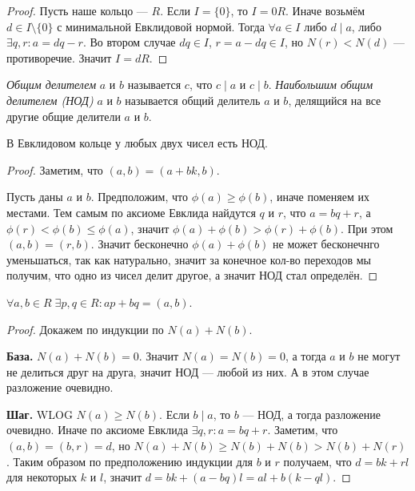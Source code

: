 \documentclass[12pt,a4paper]{article}
\begin{document}
    \begin{proof}
        Пусть наше кольцо --- $R$. Если $I = \{0\}$, то $I = 0R$. Иначе возьмём $d \in I \setminus \{0\}$ с минимальной Евклидовой нормой. Тогда $\forall a \in I$ либо $d \mid a$, либо $\exists q, r: a = dq - r$. Во втором случае $dq \in I$, $r = a - dq \in I$, но $N(r) < N(d)$ --- противоречие. Значит $I = dR$.
    \end{proof}

    \begin{definition}
        \emph{Общим делителем} $a$ и $b$ называется $c$, что $c \mid a$ и $c \mid b$. \emph{Наибольшим общим делителем (НОД)} $a$ и $b$ называется общий делитель $a$ и $b$, делящийся на все другие общие делители $a$ и $b$.
    \end{definition}

    \begin{theorem}
        В Евклидовом кольце у любых двух чисел есть НОД.
    \end{theorem}

    \begin{proof}
        Заметим, что $(a, b) = (a + bk, b)$.
        
        Пусть даны $a$ и $b$. Предположим, что $\phi(a) \geqslant \phi(b)$, иначе поменяем их местами. Тем самым по аксиоме Евклида найдутся $q$ и $r$, что $a = bq + r$, а $\phi(r) < \phi(b) \leqslant \phi(a)$, значит $\phi(a) + \phi(b) > \phi(r) + \phi(b)$. При этом $(a, b) = (r, b)$. Значит бесконечно $\phi(a) + \phi(b)$ не может бесконечнго уменьшаться, так как натурально, значит за конечное кол-во переходов мы получим, что одно из чисел делит другое, а значит НОД стал определён.
    \end{proof}

    \begin{theorem}
        $\forall a, b \in R\; \exists p, q \in R: ap + bq = (a, b)$.
    \end{theorem}

    \begin{proof}
        Докажем по индукции по $N(a) + N(b)$.

        \textbf{База.} $N(a) + N(b)=0$. Значит $N(a)=N(b)=0$, а тогда $a$ и $b$ не могут не делиться друг на друга, значит НОД --- любой из них. А в этом случае разложение очевидно.
        
        \textbf{Шаг.} WLOG $N(a) \geqslant N(b)$. Если $b \mid a$, то $b$ --- НОД, а тогда разложение очевидно. Иначе по аксиоме Евклида $\exists q, r: a = bq + r$. Заметим, что $(a, b) = (b, r) = d$, но $N(a) + N(b) \geqslant N(b) + N(b) > N(b) + N(r)$. Таким образом по предположению индукции для $b$ и $r$ получаем, что $d = bk + rl$ для некоторых $k$ и $l$, значит $d = bk + (a - bq)l = al + b(k - ql)$.
    \end{proof}
\end{document}
